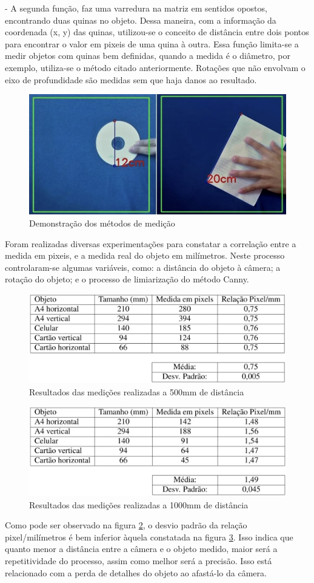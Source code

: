 \documentclass[a4paper,alpha-refs]{RBCA_v1.0}
\begin{document}
- A segunda função, faz uma varredura na matriz em sentidos opostos, encontrando duas quinas no objeto. Dessa maneira, com a informação da coordenada (x, y) das quinas, utilizou-se o conceito de distância entre dois pontos para encontrar o valor em pixeis de uma quina à outra. Essa função limita-se a medir objetos com quinas bem definidas, quando a medida é o diâmetro, por exemplo, utiliza-se o método citado anteriormente. Rotações que não envolvam o eixo de profundidade são medidas sem que haja danos ao resultado. 

\begin{figure}[h!]
	\centering
	\includegraphics[width=.3\textwidth]{img/01-IMAGEM1.jpg}
	\caption{Demonstração dos métodos de medição}
	\label{img:img1}
\end{figure}

Foram realizadas diversas experimentações para constatar a correlação entre a medida em pixeis, e a medida real do objeto em milímetros. Neste processo controlaram-se algumas variáveis, como: a distância do objeto à câmera; a rotação do objeto; e o processo de limiarização do método Canny.

\begin{figure}[h!]
	\centering
	\includegraphics[width=.3\textwidth]{img/02-TABELA1.JPG}
	\caption{Resultados das medições realizadas a 500mm de distância}
	\label{img:tabela1}
\end{figure}

\begin{figure}[h!]
	\centering
	\includegraphics[width=.3\textwidth]{img/03-TABELA2.JPG}
	\caption{Resultados das medições realizadas a 1000mm de distância}
	\label{img:tabela2}
\end{figure}

Como pode ser observado na figura \ref{img:tabela1}, o desvio padrão da relação pixel/milímetros é bem inferior àquela constatada na figura \ref{img:tabela2}. Isso indica que quanto menor a distância entre a câmera e o objeto medido, maior será a repetitividade do processo, assim como melhor será a precisão. Isso está relacionado com a perda de detalhes do objeto ao afastá-lo da câmera. 
\end{document}
